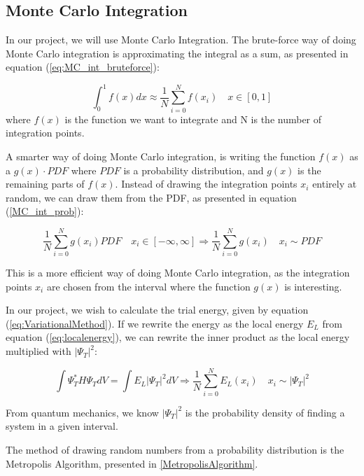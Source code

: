 \documentclass[norsk,a4paper,12pt]{article}
\begin{document}
\subsection{Monte Carlo Integration}
In our project, we will use Monte Carlo Integration. The brute-force way of doing Monte Carlo integration is approximating the integral as a sum, as presented in equation (\ref{eq:MC_int_bruteforce}):

\begin{equation}
    \int_0^1 f(x) dx \approx  \frac{1}{N}\sum_{i=0}^N f(x_i) \quad x \in [0,1]
    \label{eq:MC_int_bruteforce}
\end{equation}
where $f(x)$ is the function we want to integrate and N is the number of integration points. 

A smarter way of doing Monte Carlo integration, is writing the function $f(x)$ as a $g(x)\cdot PDF$ where $PDF$ is a probability distribution, and $g(x)$ is the remaining parts of $f(x)$. Instead of drawing the integration points $x_i$ entirely at random, we can draw them from the PDF, as presented in equation (\ref{MC_int_prob}):

\begin{equation}
    \frac{1}{N}\sum_{i=0}^N g(x_i) PDF \quad x_i \in [-\infty, \infty] \Rightarrow \frac{1}{N} \sum_{i=0}^N g(x_i) \quad x_i \sim PDF
    \label{MC_int_prob}
\end{equation}

This is a more efficient way of doing Monte Carlo integration, as the integration points $x_i$ are chosen from the interval where the function $g(x)$ is interesting.\par 

In our project, we wish to calculate the trial energy, given by equation (\ref{eq:VariationalMethod}). If we rewrite the energy as the local energy $E_L$ from equation (\ref{eq:localenergy}), we can rewrite the inner product as the local energy multiplied with $|\Psi_T|^2$:

\begin{equation}
    \int \Psi_T^* H \Psi_T dV = \int E_L |\Psi_T|^2 dV \Rightarrow \frac{1}{N} \sum_{i=0}^N E_L(x_i) \quad x_i \sim |\Psi_T|^2  
\end{equation}

From quantum mechanics, we know $|\Psi_T|^2$ is the probability density of finding a system in a given interval. 

The method of drawing random numbers from a probability distribution is the Metropolis Algorithm, presented in \ref{MetropolisAlgorithm}. 
\end{document}
